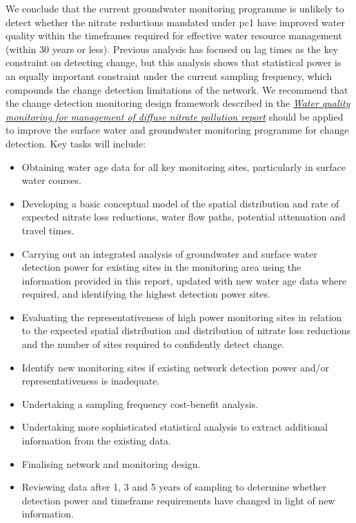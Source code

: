 We conclude that the current groundwater monitoring programme is unlikely to detect whether the nitrate reductions mandated under \gls{pc1} have improved water quality within the timeframes required for effective water resource management (within 30 years or less).
Previous analysis has focused on lag times as the key constraint on detecting change, but this analysis shows that statistical power is an equally important constraint under the current sampling frequency, which compounds the change detection limitations of the network.
We recommend that the change detection monitoring design framework described in the \textit{\href{https://github.com/Komanawa-Solutions-Ltd/gw_detect_power/blob/main/supporting_documents/Water_quality_monitoring_for_management_of_diffuse_nitrate_pollution_Final.pdf}{Water quality monitoring for management of diffuse nitrate pollution report}}\citep{olw_guidance}
should be applied to improve the surface water and groundwater monitoring programme for change detection. Key tasks will include:
\begin{itemize}
    \item Obtaining water age data for all key monitoring sites, particularly in surface water courses.
    \item Developing a basic conceptual model of the spatial distribution and rate of expected nitrate loss reductions, water flow paths, potential attenuation and travel times.
    \item Carrying out an integrated analysis of groundwater and surface water detection power for existing sites in the monitoring area using the information provided in this report, updated with new water age data where required, and identifying the highest detection power sites.
    \item Evaluating the representativeness of high power monitoring sites in relation to the expected spatial distribution and distribution of nitrate loss reductions and the number of sites required to confidently detect change.
    \item Identify new monitoring sites if existing network detection power and/or representativeness is inadequate.
    \item Undertaking a sampling frequency cost-benefit analysis.
    \item Undertaking more sophisticated statistical analysis to extract additional information from the existing data.
    \item Finalising network and monitoring design.
    \item Reviewing data after 1, 3 and 5 years of sampling to determine whether detection power and timeframe requirements have changed in light of new information.
\end{itemize}
